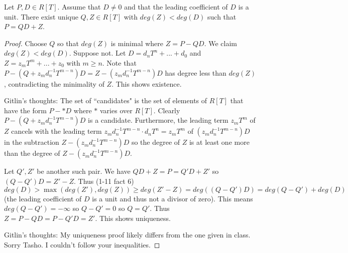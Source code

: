 \begin{prop}
Let $P,D \in R[T]$.  Assume that $D \neq 0$ and that the leading coefficient of $D$ is a unit.  There exist unique $Q,Z \in R[T]$ with $deg(Z) < deg(D)$ such that $P = QD+Z$.
\end{prop}

\begin{proof}\hspace{0.5cm}

Choose $Q$ so that $deg(Z)$ is minimal where $Z = P-QD$.  We claim $deg(Z) < deg(D)$.  Suppose not.  Let $D = d_nT^n + ... + d_0$ and $Z = z_mT^m + ... + z_0$ with $m \geq n$.  Note that $P-(Q+z_md_n^{-1}T^{m-n})D = Z - (z_md_n^{-1}T^{m-n})D$ has degree less than $deg(Z)$, contradicting the minimality of $Z$.  This shows existence.

Gitlin's thoughts:  The set of ``candidates" is the set of elements of $R[T]$ that have the form $P-*D$ where $*$ varies over $R[T]$.  Clearly $P-(Q+z_md_n^{-1}T^{m-n})D$ is a candidate.  Furthermore, the leading term $z_mT^m$ of $Z$ cancels with the leading term $z_md_n^{-1}T^{m-n} \cdot d_nT^n = z_mT^m$ of $(z_md_n^{-1}T^{m-n})D$ in the subtraction $Z - (z_md_n^{-1}T^{m-n})D$ so the degree of $Z$ is at least one more than the degree of $Z - (z_md_n^{-1}T^{m-n})D$.

Let $Q',Z'$ be another such pair.  We have $QD+Z = P = Q'D+Z'$ so $(Q-Q')D = Z'-Z$.  Thus (1-11 fact 6) $deg(D) > \max(deg(Z'),deg(Z)) \geq deg(Z'-Z) = deg((Q-Q')D) = deg(Q-Q') + deg(D)$ (the leading coefficient of $D$ is a unit and thus not a divisor of zero).  This means $deg(Q-Q') = - \infty$ so $Q-Q' = 0$ so $Q= Q'$.  Thus $Z = P-QD = P-Q'D = Z'$.  This shows uniqueness.

Gitlin's thoughts:  My uniqueness proof likely differs from the one given in class.  Sorry Tasho.  I couldn't follow your inequalities.

\end{proof}
